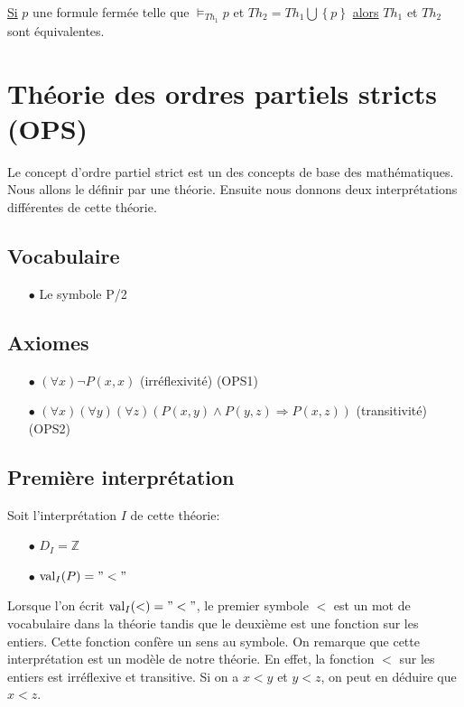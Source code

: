 {\noindent \underline{Si} $p$ une formule fermée telle que $\models_{Th_1} p$ et $Th_2 = Th_1 \bigcup \left\lbrace p \right\rbrace$ \underline{alors} $Th_1$ et $Th_2$ sont équivalentes. \\

\section{Théorie des ordres partiels stricts (OPS)}

Le concept d'ordre partiel strict est un des concepts de base des mathématiques.
Nous allons le définir par une théorie.
Ensuite nous donnons deux interprétations différentes de cette théorie.
\subsection*{Vocabulaire}
\begin{itemize}
\item[$\bullet$] Le symbole P/2
\end{itemize}
\subsection*{Axiomes}
\begin{itemize}
\item[$\bullet$] $ (\forall x) \neg P(x,x) $  (irréflexivité) (OPS1)
\item[$\bullet$] $ (\forall x) (\forall y) (\forall z) (P(x,y) \wedge P(y,z) \Rightarrow P(x,z))$ (transitivité) (OPS2)
\end{itemize}
\subsection*{Première interprétation}
Soit l'interprétation $I$ de cette théorie:
\begin{itemize}
\item[$\bullet$] $D_I = \mathbb{Z} $
\item[$\bullet$] $\mathrm{val}_I (P) = "<"$
\end{itemize}
Lorsque l'on écrit $\mathrm{val}_I(<) = "<"$, le premier symbole $<$ est un mot de vocabulaire dans la théorie
tandis que le deuxième est une fonction sur les entiers.
Cette fonction confère un sens au symbole. 
On remarque que cette interprétation est un modèle de notre théorie.
En effet, la fonction $<$ sur les entiers est irréflexive et transitive.
Si on a $x < y$ et $y <z$, on peut en déduire que $x<z$.

}
